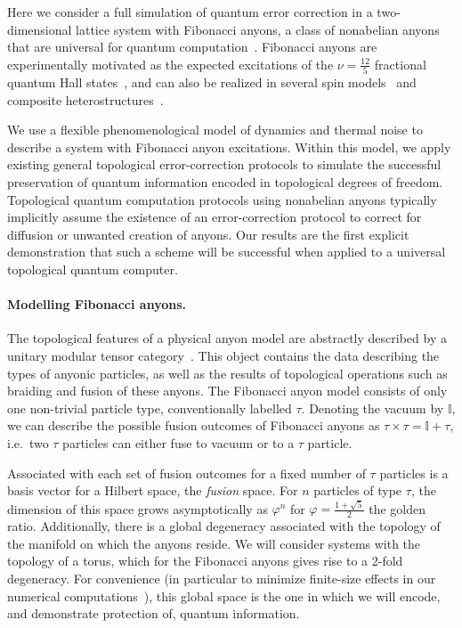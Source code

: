 \documentclass[aps, prl, letterpaper, twocolumn, superscriptaddress, notitlepage, 10pt]{revtex4-1}
\begin{document}
Here we consider a full simulation of quantum error correction in a two-dimensional lattice 
system with Fibonacci anyons, a class of nonabelian anyons that are universal for quantum 
computation~\cite{Freedman2002, Nayak2008}. Fibonacci anyons are experimentally motivated as the 
expected excitations of the $\nu=\frac{12}{5}$ fractional quantum Hall 
states~\cite{Slingerland2001}, and can also be realized in several spin 
models~\cite{Levin2005, Bonesteel2012, Kapit2013, Palumbo2014} and composite 
heterostructures~\cite{Mong2014}.

We use a flexible phenomenological model of dynamics and thermal noise to describe a system with Fibonacci anyon excitations. Within this model, we apply existing general topological error-correction protocols to simulate the successful preservation of quantum information encoded in topological degrees of freedom. Topological quantum computation protocols using nonabelian anyons typically implicitly assume the existence of an error-correction protocol to correct for diffusion or unwanted creation of anyons. Our results are the first explicit demonstration that such a scheme will be successful when applied to a universal topological quantum computer.

\paragraph{Modelling Fibonacci anyons.}

The topological features of a physical anyon model are abstractly described by a unitary 
modular tensor category~\cite{Wang2010b}. This object contains the data describing the 
types of anyonic particles, as well as the results of topological operations such as braiding and 
fusion of these anyons. The Fibonacci anyon model consists of only one non-trivial particle 
type, conventionally labelled $\tau$. Denoting the vacuum by $\mathbb{I}$, we can describe 
the possible fusion outcomes of Fibonacci anyons as $\tau\times\tau=\mathbb{I}+\tau$, 
i.e.~two $\tau$ particles can either fuse to vacuum or to a $\tau$ particle.

Associated with each set of fusion outcomes for a fixed number of $\tau$ particles is a basis 
vector for a Hilbert space, the \emph{fusion} space. For $n$ particles of type $\tau$, the 
dimension of this space grows asymptotically as $\varphi^n$ for $\varphi=\frac{1+\sqrt{5}}{2}$ 
the golden ratio. Additionally, there is a global degeneracy associated with the topology of the 
manifold on which the anyons reside. We will consider systems with the topology of a torus, 
which for the Fibonacci anyons gives rise to a 2-fold degeneracy. For convenience 
(in particular to minimize finite-size effects in our numerical computations~\cite{Brell2013}), 
this global space is the one in which we will encode, and demonstrate protection of, quantum 
information.
\end{document}
